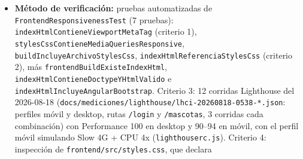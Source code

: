 \documentclass[
  spanish,
]{article}
\providecommand{\tightlist}{%
  \setlength{\itemsep}{0pt}\setlength{\parskip}{0pt}}
\begin{document}
\begin{itemize}
  \begin{enumerate}
  \def\labelenumi{\arabic{enumi}.}
  \tightlist
  \item
    El documento servido declara
    \texttt{\textless{}meta\ name="view\allowbreak{}port"\ content="wi\allowbreak{}dth=device-\allowbreak{}width,\allowbreak{}\ ..."\textgreater{}}.
  \item
    La hoja de estilos publicada contiene reglas \texttt{@media} que
    adaptan el diseño a anchos móviles.
  \item
    En corridas Lighthouse con perfil móvil y con perfil de escritorio
    sobre las rutas \texttt{/\allowbreak{}login} y \texttt{/\allowbreak{}mascotas}, la puntuación
    de Performance es ≥ 90 en todos los casos.
  \item
    La hoja de estilos publicada define al menos un punto de corte para
    anchos móviles y el diseño de las rejillas de contenido usa unidades
    relativas, de modo que a 320 px el contenido refluye en una sola
    columna en lugar de desbordarse.
  \end{enumerate}
\item
  \textbf{Método de verificación:} pruebas automatizadas de
  \texttt{Frontend\allowbreak{}Responsiveness\allowbreak{}Test} (7 pruebas):
  \texttt{index\allowbreak{}Html\allowbreak{}Contiene\allowbreak{}Viewport\allowbreak{}Meta\allowbreak{}Tag} (criterio 1),
  \texttt{styles\allowbreak{}Css\allowbreak{}Contiene\allowbreak{}Media\allowbreak{}Queries\allowbreak{}Responsive},
  \texttt{build\allowbreak{}Incluye\allowbreak{}Archivo\allowbreak{}Styles\allowbreak{}Css},
  \texttt{index\allowbreak{}Html\allowbreak{}Referencia\allowbreak{}Styles\allowbreak{}Css} (criterio 2), más
  \texttt{frontend\allowbreak{}Build\allowbreak{}Existe\allowbreak{}Index\allowbreak{}Html},
  \texttt{index\allowbreak{}Html\allowbreak{}Contiene\allowbreak{}Doctype\allowbreak{}YHtml\allowbreak{}Valido} e
  \texttt{index\allowbreak{}Html\allowbreak{}Incluye\allowbreak{}Angular\allowbreak{}Bootstrap}. Criterio 3: 12 corridas
  Lighthouse del 2026-08-18
  (\texttt{docs/\allowbreak{}mediciones/\allowbreak{}lighthouse/\allowbreak{}lhci-\allowbreak{}20260818-\allowbreak{}0538-*.\allowbreak{}json}:
  perfiles móvil y desktop, rutas \texttt{/\allowbreak{}login} y \texttt{/\allowbreak{}mascotas},
  3 corridas cada combinación) con Performance 100 en desktop y 90--94
  en móvil, con el perfil móvil simulando Slow 4G + CPU 4x
  (\texttt{lighthouserc.\allowbreak{}js}). Criterio 4: inspección de
  \texttt{frontend/\allowbreak{}src/\allowbreak{}styles.\allowbreak{}css}, que declara

\end{itemize}
\end{document}
